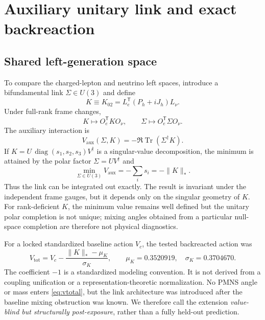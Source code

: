\documentclass[11pt]{article}
\newcommand{\Tr}{\operatorname{Tr}}
\newcommand{\diag}{\operatorname{diag}}
\begin{document}
\section{Auxiliary unitary link and exact backreaction}
\label{sec:link}

\subsection{Shared left-generation space}

To compare the charged-lepton and neutrino left spaces, introduce a bifundamental link $\Sigma\in U(3)$ and define
\begin{equation}
  K\equiv K_{02}=L_e^{\mathsf T}(P_h+iJ_h)L_\nu.
  \label{eq:leftK}
\end{equation}
Under full-rank frame changes,
\begin{equation}
  K\mapsto O_e^{\mathsf T}KO_\nu,
  \qquad
  \Sigma\mapsto O_e^{\mathsf T}\Sigma O_\nu.
\end{equation}
The auxiliary interaction is
\begin{equation}
  V_{\mathrm{aux}}(\Sigma,K)=-\Re\Tr(\Sigma^\dagger K).
  \label{eq:vaux}
\end{equation}
If $K=U\,\diag(s_1,s_2,s_3)V^\dagger$ is a singular-value decomposition, the minimum is attained by the polar factor $\Sigma=UV^\dagger$ and
\begin{equation}
  \min_{\Sigma\in U(3)}V_{\mathrm{aux}}=-\sum_i s_i=-\|K\|_*.
  \label{eq:nuclear}
\end{equation}
Thus the link can be integrated out exactly.  The result is invariant under the independent frame gauges, but it depends only on the singular geometry of $K$.
For rank-deficient $K$, the minimum value remains well defined but the unitary polar completion is not unique; mixing angles obtained from a particular null-space completion are therefore not physical diagnostics.

For a locked standardized baseline action $V_c$, the tested backreacted action was
\begin{equation}
  V_{\mathrm{tot}}
  =V_c-\frac{\|K\|_*-\mu_K}{\sigma_K},
  \qquad
  \mu_K=0.3520919,\quad \sigma_K=0.3704670.
  \label{eq:vtotal}
\end{equation}
The coefficient $-1$ is a standardized modeling convention.  It is not derived from a coupling unification or a representation-theoretic normalization.  No PMNS angle or mass enters \cref{eq:vtotal}, but the link architecture was introduced after the baseline mixing obstruction was known.  We therefore call the extension \emph{value-blind but structurally post-exposure}, rather than a fully held-out prediction.
\end{document}
